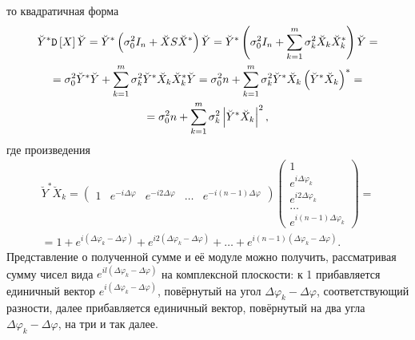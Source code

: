 то квадратичная форма
\begin{multline}
    \label{jammers:multiple:quadric}
    \breve{Y}^* \mathtt{D} \left [ X \right ] \breve{Y}
    = \breve{Y}^* \left ( \sigma_0^2 I_n + \breve{X} S \breve{X}^* \right ) \breve{Y}
    = \breve{Y}^* \left ( \sigma_0^2 I_n + \sum_{k=1}^m \sigma_k^2 \breve{X}_k \breve{X}_k^* \right ) \breve{Y} = \\
    = \sigma_0^2 \breve{Y}^* \breve{Y} + \sum_{k=1}^m \sigma_k^2 \breve{Y}^* \breve{X}_k \breve{X}_k^* \breve{Y}
    = \sigma_0^2 n + \sum_{k=1}^m \sigma_k^2 \breve{Y}^* \breve{X}_k \left ( \breve{Y}^* \breve{X}_k \right )^* = \\
    = \sigma_0^2 n + \sum_{k=1}^m \sigma_k^2 \left | \breve{Y}^* \breve{X}_k \right |^2 ,
\end{multline}
где произведения
\begin{multline*}
    \breve{Y}^* \breve{X}_k
    =
    \begin{pmatrix}
        1                       &
        e^{- i \Delta \varphi}   &
        e^{- i 2 \Delta \varphi} &
        \dots                   &
        e^{- i (n-1) \Delta \varphi}
    \end{pmatrix}
    \begin{pmatrix}
        1                        \\
        e^{i \Delta \varphi_k}   \\
        e^{i 2 \Delta \varphi_k} \\
        \dots                    \\
        e^{i (n-1) \Delta \varphi_k}
    \end{pmatrix}
    = \\
    = 1 + e^{i (\Delta \varphi_k - \Delta \varphi )} + e^{i 2 (\Delta \varphi_k - \Delta \varphi )} + \dots + e^{i (n-1) (\Delta \varphi_k - \Delta \varphi )} .
\end{multline*}
Представление о полученной сумме и её модуле можно получить, рассматривая сумму чисел вида $e^{i l (\Delta \varphi_k - \Delta \varphi )}$ на комплексной
плоскости: к 1 прибавляется единичный вектор $e^{i (\Delta \varphi_k - \Delta \varphi )}$, повёрнутый на угол $\Delta \varphi_k - \Delta \varphi$, соответствующий разности,
далее прибавляется единичный вектор, повёрнутый на два угла $\Delta \varphi_k - \Delta \varphi$, на три и так далее.

